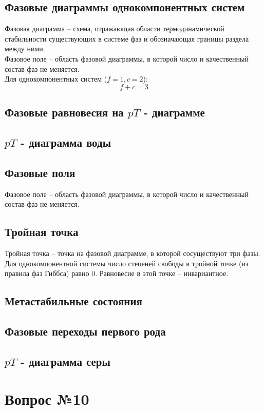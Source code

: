 \documentclass[14pt,a4paper]{scrartcl}
\begin{document}
\subsection*{Фазовые диаграммы однокомпонентных систем}
Фазовая диаграмма -- схема, отражающая области термодинамической стабильности существующих в системе фаз и обозначающая границы раздела между ними.\\
Фазовое поле -- область фазовой диаграммы, в которой число и качественный состав фаз не меняется. \\
Для однокомпонентных систем ($f = 1, c = 2$):
$$ f+c = 3 $$
\subsection*{Фазовые равновесия на $pT$ - диаграмме}
\subsection*{$pT$ - диаграмма воды}
\subsection*{Фазовые поля}
Фазовое поле -- область фазовой диаграммы, в которой число и качественный состав фаз не меняется.
\subsection*{Тройная точка}
Тройная точка -- точка на фазовой диаграмме, в которой сосуществуют три фазы. Для однокомпонентной системы число степеней свободы в тройной точке (из правила фаз Гиббса) равно 0. Равновесие в этой точке -- инвариантное.
\subsection*{Метастабильные состояния}
\subsection*{Фазовые переходы первого рода}
\subsection*{$pT$ - диаграмма серы}
	
\section*{Вопрос №10}
\end{document}
